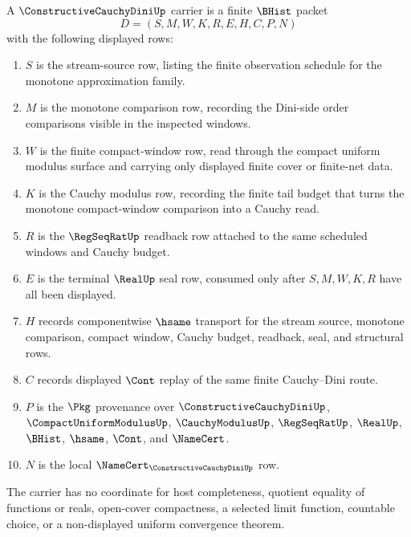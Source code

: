 \begin{definition}
\label{def:constructive-cauchy-dini-carrier}
A $\ConstructiveCauchyDiniUp$ carrier is a finite $\BHist$ packet
$$
D=(S,M,W,K,R,E,H,C,P,N)
$$
with the following displayed rows:
\begin{enumerate}
\item $S$ is the stream-source row, listing the finite observation schedule for the monotone approximation family.
\item $M$ is the monotone comparison row, recording the Dini-side order comparisons visible in the inspected windows.
\item $W$ is the finite compact-window row, read through the compact uniform modulus surface and carrying only displayed finite cover or finite-net data.
\item $K$ is the Cauchy modulus row, recording the finite tail budget that turns the monotone compact-window comparison into a Cauchy read.
\item $R$ is the $\RegSeqRatUp$ readback row attached to the same scheduled windows and Cauchy budget.
\item $E$ is the terminal $\RealUp$ seal row, consumed only after $S,M,W,K,R$ have all been displayed.
\item $H$ records componentwise $\hsame$ transport for the stream source, monotone comparison, compact window, Cauchy budget, readback, seal, and structural rows.
\item $C$ records displayed $\Cont$ replay of the same finite Cauchy--Dini route.
\item $P$ is the $\Pkg$ provenance over $\ConstructiveCauchyDiniUp$, $\CompactUniformModulusUp$, $\CauchyModulusUp$, $\RegSeqRatUp$, $\RealUp$, $\BHist$, $\hsame$, $\Cont$, and $\NameCert$.
\item $N$ is the local $\NameCert_{\ConstructiveCauchyDiniUp}$ row.
\end{enumerate}
The carrier has no coordinate for host completeness, quotient equality of functions or reals, open-cover compactness, a selected limit function, countable choice, or a non-displayed uniform convergence theorem.
\end{definition}

